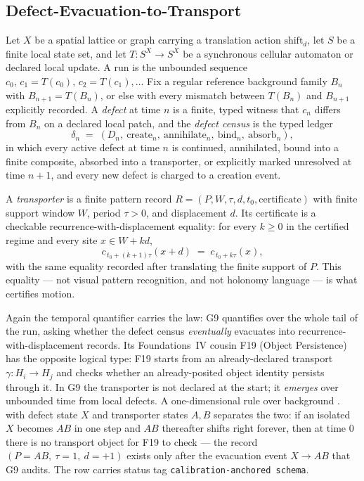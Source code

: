 \documentclass[11pt]{article}
\newcommand{\lawGNine}{Defect-Evacuation-to-Transport}
\theoremstyle{definition}
\begin{document}
\subsection{\lawGNine}\label{sec:clusterC:g9}

Let $X$ be a spatial lattice or graph carrying a translation action $\mathrm{shift}_d$, let $S$ be a
finite local state set, and let $T : S^{X} \to S^{X}$ be a synchronous cellular automaton or declared
local update. A run is the unbounded sequence $c_0,\, c_1 = T(c_0),\, c_2 = T(c_1), \ldots$ Fix a
regular reference background family $B_n$ with $B_{n+1} = T(B_n)$, or else with every mismatch between
$T(B_n)$ and $B_{n+1}$ explicitly recorded. A \emph{defect} at time $n$ is a finite, typed witness
that $c_n$ differs from $B_n$ on a declared local patch, and the \emph{defect census} is the typed
ledger
\[
  \delta_n \;=\; (D_n,\ \mathrm{create}_n,\ \mathrm{annihilate}_n,\ \mathrm{bind}_n,\ \mathrm{absorb}_n),
\]
in which every active defect at time $n$ is continued, annihilated, bound into a finite composite,
absorbed into a transporter, or explicitly marked unresolved at time $n+1$, and every new defect is
charged to a creation event.

A \emph{transporter} is a finite pattern record $R = (P, W, \tau, d, t_0, \mathrm{certificate})$ with
finite support window $W$, period $\tau > 0$, and displacement $d$. Its certificate is a checkable
recurrence-with-displacement equality: for every $k \ge 0$ in the certified regime and every site
$x \in W + k d$,
\[
  c_{\,t_0 + (k+1)\tau}(x + d) \;=\; c_{\,t_0 + k\tau}(x),
\]
with the same equality recorded after translating the finite support of $P$. This equality --- not
visual pattern recognition, and not holonomy language --- is what certifies motion.

Again the temporal quantifier carries the law: G9 quantifies over the whole tail of the run, asking
whether the defect census \emph{eventually} evacuates into recurrence-with-displacement records. Its
Foundations~IV cousin F19 (Object Persistence) has the opposite logical type: F19 starts from an
already-declared transport $\gamma : H_i \to H_j$ and checks whether an already-posited object
identity persists through it. In G9 the transporter is not declared at the start; it \emph{emerges}
over unbounded time from local defects. A one-dimensional rule over background ${.}$ with defect state
$X$ and transporter states $A,B$ separates the two: if an isolated $X$ becomes $AB$ in one step and
$AB$ thereafter shifts right forever, then at time $0$ there is no transport object for F19 to check
--- the record $(P{=}AB,\ \tau{=}1,\ d{=}{+}1)$ exists only after the evacuation event $X \to AB$ that
G9 audits. The row carries status tag \texttt{calibration-anchored schema}.
\end{document}
